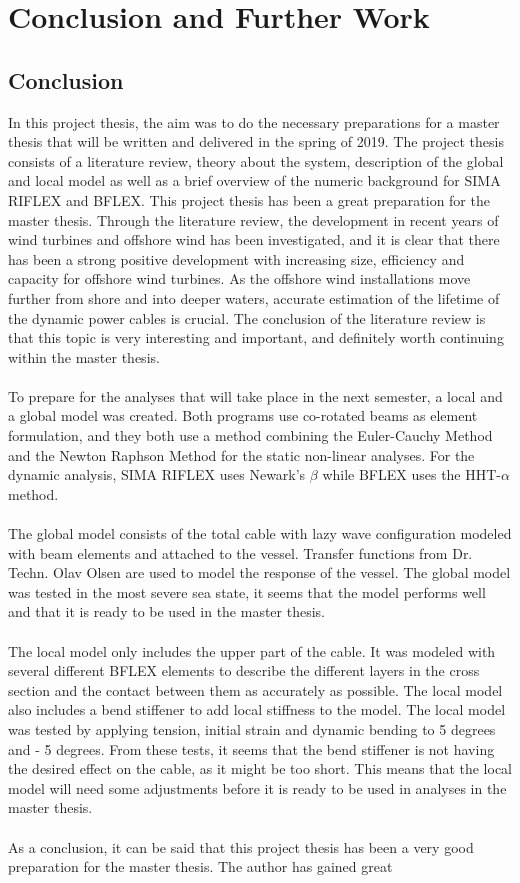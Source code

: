\chapter{Conclusion and Further Work}
\label{chap:conclusion}
\section{Conclusion}
In this project thesis, the aim was to do the necessary preparations for a master thesis that will be written and delivered in the spring of 2019. The project thesis consists of a literature review, theory about the system, description of the global and local model as well as a brief overview of the numeric background for SIMA RIFLEX and BFLEX. This project thesis has been a great preparation for the master thesis. Through the literature review, the development in recent years of wind turbines and offshore wind has been investigated, and it is clear that there has been a strong positive development with increasing size, efficiency and capacity for offshore wind turbines. As the offshore wind installations move further from shore and into deeper waters, accurate estimation of the lifetime of the dynamic power cables is crucial. The conclusion of the literature review is that this topic is very interesting and important, and definitely worth continuing within the master thesis. \\\\ To prepare for the analyses that will take place in the next semester, a local and a global model was created. Both programs use co-rotated beams as element formulation, and they both use a method combining the Euler-Cauchy Method and the Newton Raphson Method for the static non-linear analyses. For the dynamic analysis, SIMA RIFLEX uses Newark's $\beta$ while BFLEX uses the HHT-$\alpha$ method. \\\\ The global model consists of the total cable with lazy wave configuration modeled with beam elements and attached to the vessel. Transfer functions from Dr. Techn. Olav Olsen are used to model the response of the vessel. The global model was tested in the most severe sea state, it seems that the model performs well and that it is ready to be used in the master thesis.  \\\\The local model only includes the upper part of the cable. It was modeled with several different BFLEX elements to describe the different layers in the cross section and the contact between them as accurately as possible. The local model also includes a bend stiffener to add local stiffness to the model. The local model was tested by applying tension, initial strain and dynamic bending to 5 degrees and - 5 degrees. From these tests, it seems that the bend stiffener is not having the desired effect on the cable, as it might be too short. This means that the local model will need some adjustments before it is ready to be used in analyses in the master thesis.  \\\\ As a conclusion, it can be said that this project thesis has been a very good preparation for the master thesis. The author has gained great 